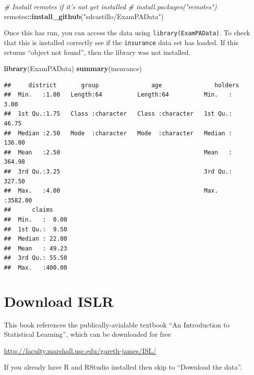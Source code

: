 \documentclass[
  openany]{book}
\newenvironment{Shaded}{\begin{snugshade}}{\end{snugshade}}
\newcommand{\CommentTok}[1]{\textcolor[rgb]{0.56,0.35,0.01}{\textit{#1}}}
\newcommand{\KeywordTok}[1]{\textcolor[rgb]{0.13,0.29,0.53}{\textbf{#1}}}
\newcommand{\NormalTok}[1]{#1}
\newcommand{\OperatorTok}[1]{\textcolor[rgb]{0.81,0.36,0.00}{\textbf{#1}}}
\newcommand{\StringTok}[1]{\textcolor[rgb]{0.31,0.60,0.02}{#1}}
\begin{document}
\begin{Shaded}
\begin{Highlighting}[]
\CommentTok{# Install remotes if it's not yet installed}
\CommentTok{# install.packages("remotes")}
\NormalTok{remotes}\OperatorTok{::}\KeywordTok{install_github}\NormalTok{(}\StringTok{"sdcastillo/ExamPAData"}\NormalTok{)}
\end{Highlighting}
\end{Shaded}

Once this has run, you can access the data using \texttt{library(ExamPAData)}. To check that this is installed correctly see if the \texttt{insurance} data set has loaded. If this returns ``object not found'', then the library was not installed.

\begin{Shaded}
\begin{Highlighting}[]
\KeywordTok{library}\NormalTok{(ExamPAData)}
\KeywordTok{summary}\NormalTok{(insurance)}
\end{Highlighting}
\end{Shaded}

\begin{verbatim}
##     district       group               age               holders       
##  Min.   :1.00   Length:64          Length:64          Min.   :   3.00  
##  1st Qu.:1.75   Class :character   Class :character   1st Qu.:  46.75  
##  Median :2.50   Mode  :character   Mode  :character   Median : 136.00  
##  Mean   :2.50                                         Mean   : 364.98  
##  3rd Qu.:3.25                                         3rd Qu.: 327.50  
##  Max.   :4.00                                         Max.   :3582.00  
##      claims      
##  Min.   :  0.00  
##  1st Qu.:  9.50  
##  Median : 22.00  
##  Mean   : 49.23  
##  3rd Qu.: 55.50  
##  Max.   :400.00
\end{verbatim}

\hypertarget{download-islr}{%
\section{Download ISLR}\label{download-islr}}

This book references the publically-avialable textbook ``An Introduction to Statistical Learning'', which can be downloaded for free

\url{http://faculty.marshall.usc.edu/gareth-james/ISL/}

If you already have R and RStudio installed then skip to ``Download the data''.
\end{document}

